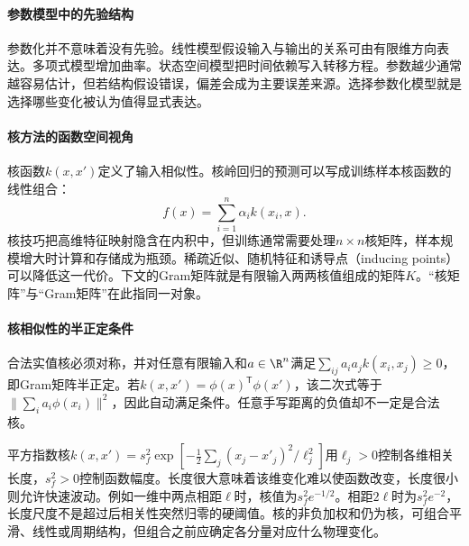 \paragraph{参数模型中的先验结构}
参数化并不意味着没有先验。线性模型假设输入与输出的关系可由有限维方向表达。多项式模型增加曲率。状态空间模型把时间依赖写入转移方程。参数越少通常越容易估计，但若结构假设错误，偏差会成为主要误差来源。选择参数化模型就是选择哪些变化被认为值得显式表达。

\paragraph{核方法的函数空间视角}
核函数$k(x,x')$定义了输入相似性。核岭回归的预测可以写成训练样本核函数的线性组合：
\begin{equation}
 f(x)=\sum_{i=1}^{n}\alpha_i k(x_i,x).
\end{equation}
核技巧把高维特征映射隐含在内积中，但训练通常需要处理$n\times n$核矩阵，样本规模增大时计算和存储成为瓶颈。稀疏近似、随机特征和诱导点（inducing points）可以降低这一代价。下文的Gram矩阵就是有限输入两两核值组成的矩阵$K$。“核矩阵”与“Gram矩阵”在此指同一对象。

\paragraph{核相似性的半正定条件}
合法实值核必须对称，并对任意有限输入和$a\in\R^n$满足$\sum_{ij}a_ia_jk(x_i,x_j)\geq0$，即Gram矩阵半正定。若$k(x,x')=\phi(x)^{\mathsf T}\phi(x')$，该二次式等于$\|\sum_ia_i\phi(x_i)\|^2$，因此自动满足条件。任意手写距离的负值却不一定是合法核。

平方指数核$k(x,x')=s_f^2\exp[-\frac12\sum_j(x_j-x'_j)^2/\ell_j^2]$用$\ell_j>0$控制各维相关长度，$s_f^2>0$控制函数幅度。长度很大意味着该维变化难以使函数改变，长度很小则允许快速波动。例如一维中两点相距$\ell$时，核值为$s_f^2e^{-1/2}$。相距$2\ell$时为$s_f^2e^{-2}$，长度尺度不是超过后相关性突然归零的硬阈值。核的非负加权和仍为核，可组合平滑、线性或周期结构，但组合之前应确定各分量对应什么物理变化。

